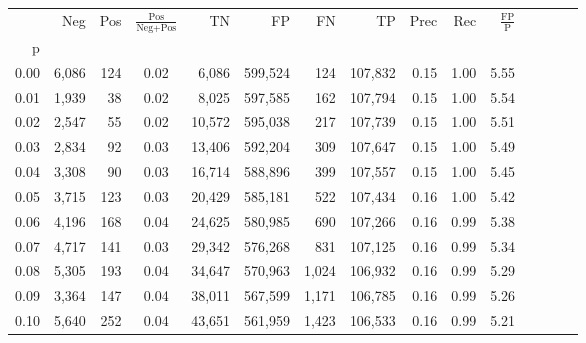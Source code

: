 \begin{tabular}{rrrcrrrrrrrrrrr}
\toprule
{} &     Neg &    Pos & $\frac{\text{Pos}}{\text{Neg}+\text{Pos}}$ &       TN &       FP &       FN &       TP &  Prec &   Rec & $\frac{\text{FP}}{\text{P}}$ \\
p    &         &        &                                            &          &          &          &          &       &       &                              \\
\midrule
0.00 &   6,086 &    124 &                                       0.02 &    6,086 &  599,524 &      124 &  107,832 &  0.15 &  1.00 &                         5.55 \\
0.01 &   1,939 &     38 &                                       0.02 &    8,025 &  597,585 &      162 &  107,794 &  0.15 &  1.00 &                         5.54 \\
0.02 &   2,547 &     55 &                                       0.02 &   10,572 &  595,038 &      217 &  107,739 &  0.15 &  1.00 &                         5.51 \\
0.03 &   2,834 &     92 &                                       0.03 &   13,406 &  592,204 &      309 &  107,647 &  0.15 &  1.00 &                         5.49 \\
0.04 &   3,308 &     90 &                                       0.03 &   16,714 &  588,896 &      399 &  107,557 &  0.15 &  1.00 &                         5.45 \\
0.05 &   3,715 &    123 &                                       0.03 &   20,429 &  585,181 &      522 &  107,434 &  0.16 &  1.00 &                         5.42 \\
0.06 &   4,196 &    168 &                                       0.04 &   24,625 &  580,985 &      690 &  107,266 &  0.16 &  0.99 &                         5.38 \\
0.07 &   4,717 &    141 &                                       0.03 &   29,342 &  576,268 &      831 &  107,125 &  0.16 &  0.99 &                         5.34 \\
0.08 &   5,305 &    193 &                                       0.04 &   34,647 &  570,963 &    1,024 &  106,932 &  0.16 &  0.99 &                         5.29 \\
0.09 &   3,364 &    147 &                                       0.04 &   38,011 &  567,599 &    1,171 &  106,785 &  0.16 &  0.99 &                         5.26 \\
0.10 &   5,640 &    252 &                                       0.04 &   43,651 &  561,959 &    1,423 &  106,533 &  0.16 &  0.99 &                         5.21 \\

\end{tabular}
